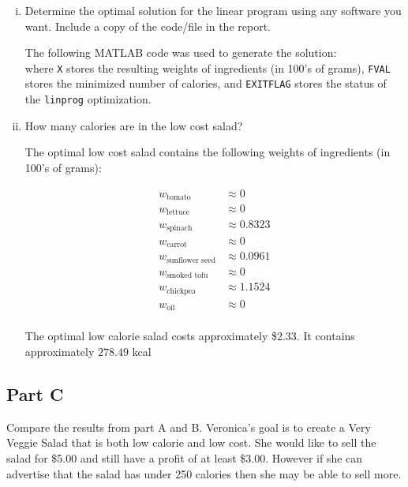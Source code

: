 \documentclass[../main.tex]{subfiles}
\begin{document}
\begin{enumerate}[i.]
	\item Determine the optimal solution for the linear program using any software you want. Include a copy of the code/file in the report.

	The following MATLAB code was used to generate the solution: \\

	

	where \verb|X| stores the resulting weights of ingredients (in 100's of grams), \verb|FVAL| stores the minimized number of calories, and \verb|EXITFLAG| stores the status of the \verb|linprog| optimization.

	\item How many calories are in the low cost salad?

	The optimal low cost salad contains the following weights of ingredients (in 100's of grams):

	\begin{equation*}
		\begin{aligned}
			w_{\text{tomato}} &\approx 0 \\
			w_{\text{lettuce}} &\approx 0 \\
			w_{\text{spinach}} &\approx 0.8323 \\
			w_{\text{carrot}} &\approx 0 \\
			w_{\text{sunflower seed}} &\approx 0.0961 \\
			w_{\text{smoked tofu}} &\approx 0 \\
			w_{\text{chickpea}} &\approx 1.1524 \\
			w_{\text{oil}} &\approx 0 \\
		\end{aligned}
	\end{equation*}

	The optimal low calorie salad costs approximately \$2.33. It contains approximately $278.49$ kcal


\end{enumerate}

\subsection*{Part C}
Compare the results from part A and B. Veronica’s goal is to create a Very Veggie Salad that is both low calorie and low cost. She would like to sell the salad for \$5.00 and still have a profit of at least \$3.00. However if she can advertise that the salad has under 250 calories then she may be able to sell more.
\end{document}
